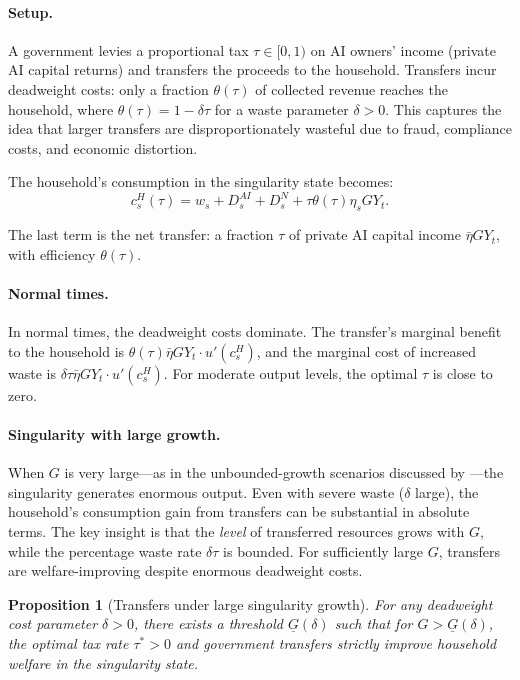 \documentclass[12pt]{article}
\newtheorem{proposition}{Proposition}
\begin{document}
\paragraph{Setup.} A government levies a proportional tax $\tau \in [0,1)$ on AI owners' income (private AI capital returns) and transfers the proceeds to the household. Transfers incur deadweight costs: only a fraction $\theta(\tau)$ of collected revenue reaches the household, where $\theta(\tau) = 1 - \delta \tau$ for a waste parameter $\delta > 0$. This captures the idea that larger transfers are disproportionately wasteful due to fraud, compliance costs, and economic distortion.

The household's consumption in the singularity state becomes:
\begin{equation}
    c_s^H(\tau) = w_s + D_s^{AI} + D_s^{N} + \tau \theta(\tau) \eta_s G Y_t. \label{eq:transfer_consumption}
\end{equation}

The last term is the net transfer: a fraction $\tau$ of private AI capital income $\bar{\eta} G Y_t$, with efficiency $\theta(\tau)$.

\paragraph{Normal times.} In normal times, the deadweight costs dominate. The transfer's marginal benefit to the household is $\theta(\tau) \bar{\eta} G Y_t \cdot u'(c_s^H)$, and the marginal cost of increased waste is $\delta \tau \bar{\eta} G Y_t \cdot u'(c_s^H)$. For moderate output levels, the optimal $\tau$ is close to zero.

\paragraph{Singularity with large growth.} When $G$ is very large---as in the unbounded-growth scenarios discussed by \citet{Jones2024}---the singularity generates enormous output. Even with severe waste ($\delta$ large), the household's consumption gain from transfers can be substantial in absolute terms. The key insight is that the \emph{level} of transferred resources grows with $G$, while the percentage waste rate $\delta\tau$ is bounded. For sufficiently large $G$, transfers are welfare-improving despite enormous deadweight costs.

\begin{proposition}[Transfers under large singularity growth] \label{prop:transfers}
For any deadweight cost parameter $\delta > 0$, there exists a threshold $\underline{G}(\delta)$ such that for $G > \underline{G}(\delta)$, the optimal tax rate $\tau^* > 0$ and government transfers strictly improve household welfare in the singularity state.
\end{proposition}
\end{document}
